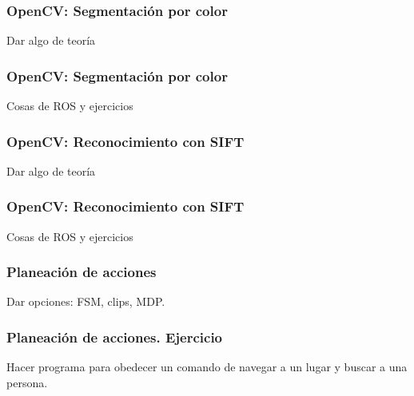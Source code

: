 \documentclass[10pt,spanish,aspectratio=1610]{beamer}
\begin{document}
\begin{frame}\frametitle{OpenCV: Segmentación por color}
  Dar algo de teoría
\end{frame}

\begin{frame}\frametitle{OpenCV: Segmentación por color}
  Cosas de ROS y ejercicios
\end{frame}

\begin{frame}\frametitle{OpenCV: Reconocimiento con SIFT}
  Dar algo de teoría
\end{frame}

\begin{frame}\frametitle{OpenCV: Reconocimiento con SIFT}
  Cosas de ROS y ejercicios
\end{frame}

\begin{frame}\frametitle{Planeación de acciones}
Dar opciones: FSM, clips, MDP.  
\end{frame}

\begin{frame}\frametitle{Planeación de acciones. Ejercicio}
Hacer programa para obedecer un comando de navegar a un lugar y buscar a una persona.
\end{frame}
\end{document}

